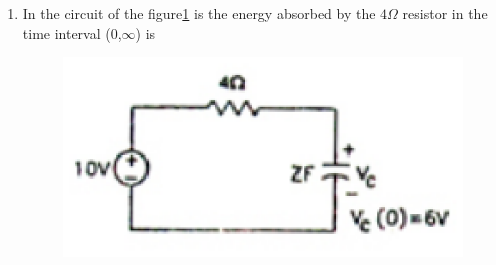 \documentclass[journal,12pt,twocolumn]{IEEEtran}
\begin{document}
\begin{enumerate}
\begin{enumerate}
\end{enumerate}


\item In the circuit of the figure\ref{fig15} is the energy absorbed by the $4\Omega$ resistor in the time interval (0,$\infty$) is
\begin{figure}[!h]
\begin{center}
\includegraphics[scale=0.7]{./figs/fig15.eps}
\caption{}
\label{fig15}
\end{center}
\end{figure}

\begin{enumerate}
\setlength\itemsep{2em}

\end{enumerate}



\end{enumerate}
\end{document}
